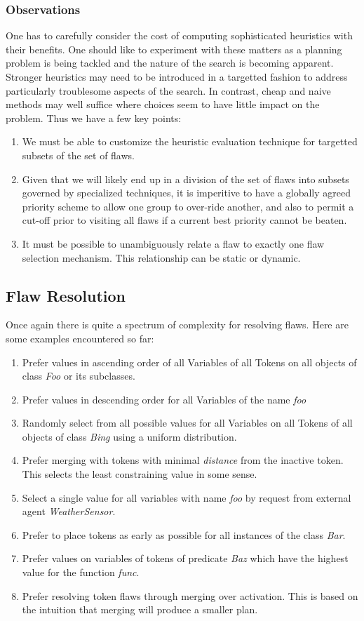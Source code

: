 \documentclass[10pt, letterpaper, oneside]{article}
\begin{document}
\subsubsection{Observations}
One has to carefully consider the cost of computing sophisticated heuristics with their benefits. One should like to experiment with these matters as a planning problem is being tackled and the nature of the search is becoming apparent. Stronger heuristics may need to be introduced in a targetted fashion to address particularly troublesome aspects of the search. In contrast, cheap and naive methods may well suffice where choices seem to have little impact on the problem. Thus we have a few key points:
\begin{enumerate}
\item We must be able to customize the heuristic evaluation technique for targetted subsets of the set of flaws.
\item Given that we will likely end up in a division of the set of flaws into subsets governed by specialized techniques, it is imperitive to have a globally agreed priority scheme to allow one group to over-ride another, and also to permit a cut-off prior to visiting all flaws if a current best priority cannot be beaten.
\item It must be possible to unambiguously relate a flaw to exactly one flaw selection mechanism. This relationship can be static or dynamic.
\end{enumerate}

\subsection{Flaw Resolution}
Once again there is quite a spectrum of complexity for resolving flaws. Here are some examples encountered so far:
\begin{enumerate}
\item Prefer values in ascending order of all Variables of all Tokens on all objects of class {\em Foo} or its subclasses.
\item Prefer values in descending order for all Variables of the name {\em foo}
\item Randomly select from all possible values for all Variables on all Tokens of all objects of class {\em Bing} using a uniform distribution.
\item Prefer merging with tokens with minimal {\em distance} from the inactive token. This selects the least constraining value in some sense.
\item Select a single value for all variables with name {\em foo} by request from external agent {\em WeatherSensor}.
\item Prefer to place tokens as early as possible for all instances of the class {\em Bar}.
\item Prefer values on variables of tokens of predicate {\em Baz} which have the highest value for the function {\em func}.
\item Prefer resolving token flaws through merging over activation. This is based on the intuition that merging will produce a smaller plan.
\end{enumerate}
\end{document}
